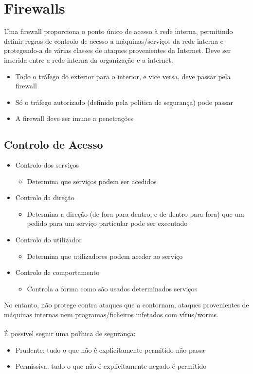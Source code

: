 \documentclass[10pt,a4paper]{report}
\begin{document}
\section{Firewalls}
Uma firewall proporciona o ponto único de acesso à rede interna, permitindo definir
regras de controlo de acesso a máquinas/serviços da rede interna e protegendo-a de
várias classes de ataques provenientes da Internet. Deve ser inserida entre a rede interna da organização e a internet.
\begin{itemize}
\item Todo o tráfego do exterior para o interior, e vice versa, deve passar pela firewall
\item Só o tráfego autorizado (definido pela política de segurança) pode passar
\item A firewall deve ser imune a penetrações
\end{itemize}
\subsection{Controlo de Acesso}
\begin{itemize}
\item Controlo dos serviços
\begin{itemize}
\item Determina que serviços podem ser acedidos
\end{itemize}
\item Controlo da direção
\begin{itemize}
\item Determina a direção (de fora para dentro, e de dentro para fora) que um
pedido para um serviço particular pode ser executado
\end{itemize}
\item Controlo do utilizador
\begin{itemize}
\item Determina que utilizadores podem aceder ao serviço
\end{itemize}
\item Controlo de comportamento
\begin{itemize}
\item Controla a forma como são usados determinados serviços
\end{itemize}
\end{itemize}
No entanto, não protege contra ataques que a contornam, ataques provenientes de máquinas internas nem programas/ficheiros infetados com vírus/worms.\\
\\
É possível seguir uma política de segurança:
\begin{itemize}
\item Prudente: tudo o que não é explicitamente permitido não passa
\item Permissiva: tudo o que não é explicitamente negado é permitido
\end{itemize}
\end{document}
